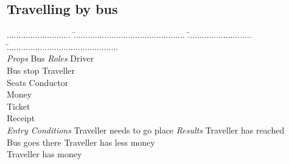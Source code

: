\documentclass[11pt,a4paper]{article}
\begin{document}
	
	\subsection{Travelling by bus}
	\begin{tabbing}
	........................... \= ............................................... 
	\= ........................... \= ............................................... \\
	\textit{Props} \> Bus \> \textit{Roles} \> Driver \\
				\> Bus stop \> 				\> Traveller \\
				\> Seats	\>				\> Conductor \\
				\> Money	\>				\> \\
				\> Ticket	\>				\>	\\
				\> Receipt	\>				\>	\\
	\textit{Entry Conditions} \> Traveller needs to go place \> 
	\textit{Results} \>	Traveller has reached\\
				\> Bus goes there	\>	\>	Traveller has less money \\
				\> Traveller has money	\> \> \\
	\end{tabbing}
	
\end{document}
